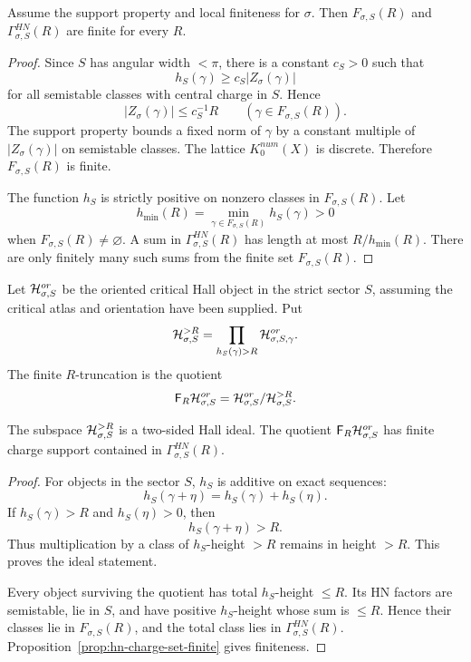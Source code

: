 \begin{proposition}
\label{prop:hn-charge-set-finite}
Assume the support property and local finiteness for \(\sigma\).  Then
\(F_{\sigma,S}(R)\) and \(\Gamma_{\sigma,S}^{HN}(R)\) are finite for
every \(R\).
\end{proposition}

\begin{proof}
Since \(S\) has angular width \(<\pi\), there is a constant
\(c_S>0\) such that
\[
  h_S(\gamma)\ge c_S|Z_\sigma(\gamma)|
\]
for all semistable classes with central charge in \(S\).  Hence
\[
  |Z_\sigma(\gamma)|\le c_S^{-1}R
  \qquad(\gamma\in F_{\sigma,S}(R)).
\]
The support property bounds a fixed norm of \(\gamma\) by a constant
multiple of \(|Z_\sigma(\gamma)|\) on semistable classes.  The lattice
\(K_0^{num}(X)\) is discrete.  Therefore \(F_{\sigma,S}(R)\) is finite.

The function \(h_S\) is strictly positive on nonzero classes in
\(F_{\sigma,S}(R)\).  Let
\[
  h_{\min}(R)=\min_{\gamma\in F_{\sigma,S}(R)}h_S(\gamma)>0
\]
when \(F_{\sigma,S}(R)\ne\varnothing\).  A sum in
\(\Gamma_{\sigma,S}^{HN}(R)\) has length at most \(R/h_{\min}(R)\).
There are only finitely many such sums from the finite set
\(F_{\sigma,S}(R)\).
\end{proof}

\begin{definition}
\label{def:h-adic-hall-quotient}
Let \(\mathcal H_{\sigma,S}^{or}\) be the oriented critical Hall object in
the strict sector \(S\), assuming the critical atlas and orientation have
been supplied.  Put
\[
  \mathcal H_{\sigma,S}^{>R}
  =
  \prod_{h_S(\gamma)>R}
  \mathcal H_{\sigma,S,\gamma}^{or}.
\]
The finite \(R\)-truncation is the quotient
\[
  \mathsf F_R\mathcal H_{\sigma,S}^{or}
  =
  \mathcal H_{\sigma,S}^{or}/\mathcal H_{\sigma,S}^{>R}.
\]
\end{definition}

\begin{proposition}
\label{prop:h-adic-quotient-finite-hall}
The subspace \(\mathcal H_{\sigma,S}^{>R}\) is a two-sided Hall ideal.  The
quotient \(\mathsf F_R\mathcal H_{\sigma,S}^{or}\) has finite charge support
contained in \(\Gamma_{\sigma,S}^{HN}(R)\).
\end{proposition}

\begin{proof}
For objects in the sector \(S\), \(h_S\) is additive on exact sequences:
\[
  h_S(\gamma+\eta)=h_S(\gamma)+h_S(\eta).
\]
If \(h_S(\gamma)>R\) and \(h_S(\eta)>0\), then
\[
  h_S(\gamma+\eta)>R.
\]
Thus multiplication by a class of \(h_S\)-height \(>R\) remains in
height \(>R\).  This proves the ideal statement.

Every object surviving the quotient has total \(h_S\)-height \(\le R\).
Its HN factors are semistable, lie in \(S\), and have positive
\(h_S\)-height whose sum is \(\le R\).  Hence their classes lie in
\(F_{\sigma,S}(R)\), and the total class lies in
\(\Gamma_{\sigma,S}^{HN}(R)\).  Proposition~\ref{prop:hn-charge-set-finite}
gives finiteness.
\end{proof}

